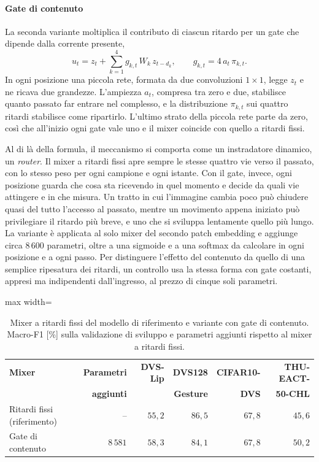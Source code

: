 \paragraph{Gate di contenuto}
La seconda variante moltiplica il contributo di ciascun ritardo per un gate che dipende dalla corrente presente,
\begin{equation}
\label{eq:cmlcm_gate}
u_t=z_t+\sum_{k=1}^{4}g_{k,t}\,W_k\,z_{t-d_k},
\qquad
g_{k,t}=4\,a_t\,\pi_{k,t}.
\end{equation}
In ogni posizione una piccola rete, formata da due convoluzioni $1\times1$, legge $z_t$ e ne ricava due grandezze. L'ampiezza $a_t$, compresa tra zero e due, stabilisce quanto passato far entrare nel complesso, e la distribuzione $\pi_{k,t}$ sui quattro ritardi stabilisce come ripartirlo. L'ultimo strato della piccola rete parte da zero, così che all'inizio ogni gate vale uno e il mixer coincide con quello a ritardi fissi.

Al di là della formula, il meccanismo si comporta come un instradatore dinamico, un \emph{router}. Il mixer a ritardi fissi apre sempre le stesse quattro vie verso il passato, con lo stesso peso per ogni campione e ogni istante. Con il gate, invece, ogni posizione guarda che cosa sta ricevendo in quel momento e decide da quali vie attingere e in che misura. Un tratto in cui l'immagine cambia poco può chiudere quasi del tutto l'accesso al passato, mentre un movimento appena iniziato può privilegiare il ritardo più breve, e uno che si sviluppa lentamente quello più lungo. La variante è applicata al solo mixer del secondo patch embedding e aggiunge circa $8\,600$ parametri, oltre a una sigmoide e a una softmax da calcolare in ogni posizione e a ogni passo. Per distinguere l'effetto del contenuto da quello di una semplice ripesatura dei ritardi, un controllo usa la stessa forma con gate costanti, appresi ma indipendenti dall'ingresso, al prezzo di cinque soli parametri.

\begin{table}[t]
\centering
\small
\renewcommand{\arraystretch}{1.2}
\caption[Gate di contenuto sui quattro dataset]{Mixer a ritardi fissi del modello di riferimento e variante con gate di contenuto. Macro-F1 [\%] sulla validazione di sviluppo e parametri aggiunti rispetto al mixer a ritardi fissi.}
\label{tab:ritardi_adattivi}
\begin{adjustbox}{max width=\textwidth}
\begin{tabular}{@{}l r r r r r@{}}
\hline
\textbf{Mixer} & \textbf{Parametri} & \textbf{DVS-Lip} & \textbf{DVS128} & \textbf{CIFAR10-} & \textbf{THU-EACT-} \\
 & \textbf{aggiunti} & & \textbf{Gesture} & \textbf{DVS} & \textbf{50-CHL} \\
\hline
Ritardi fissi (riferimento) & -- & $55{,}2$ & $86{,}5$ & $67{,}8$ & $45{,}6$ \\
Gate di contenuto & $8\,581$ & $58{,}3$ & $84{,}1$ & $67{,}8$ & $50{,}2$ \\
\hline
\end{tabular}
\end{adjustbox}
\end{table}

